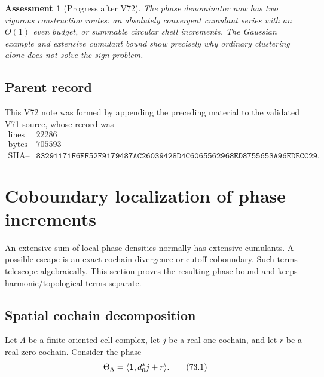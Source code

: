 \documentclass[11pt]{article}
\newtheorem{assessment}[theorem]{Assessment}
\begin{document}
\begin{assessment}[Progress after V72]
\label{ass:v11v72-status}
The phase denominator now has two rigorous construction routes:
an absolutely convergent cumulant series with an \(O(1)\) even budget,
or summable circular shell increments.  The Gaussian example and
extensive cumulant bound show precisely why ordinary clustering alone
does not solve the sign problem.
\end{assessment}

\subsection{Parent record}

This V72 note was formed by appending the preceding material to the
validated V71 source, whose record was
\[
\begin{array}{c|c}
\text{lines}&22286\\
\text{bytes}&705593\\
\text{SHA--256}&
\texttt{83291171F6FF52F9179487AC26039428D4C6065562968ED8755653A96EDECC29}.
\end{array}                                                     \tag{72.21}
\]


\section{Coboundary localization of phase increments}
\label{sec:v11v73}

An extensive sum of local phase densities normally has extensive
cumulants.  A possible escape is an exact cochain divergence or cutoff
coboundary.  Such terms telescope algebraically.  This section proves
the resulting phase bound and keeps harmonic/topological terms
separate.

\subsection{Spatial cochain decomposition}

Let \(\Lambda\) be a finite oriented cell complex, let \(j\) be a real
one-cochain, and let \(r\) be a real zero-cochain.  Consider the phase
\[
                         \Theta_\Lambda
                    =\langle{\bf1},d_0^*j+r\rangle.           \tag{73.1}
\]
\end{document}
